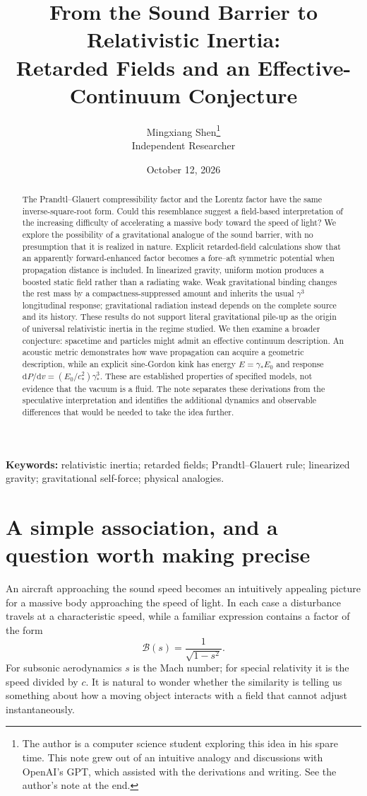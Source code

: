 \documentclass[11pt,a4paper]{article}
\title{From the Sound Barrier to Relativistic Inertia:\\
\large Retarded Fields and an Effective-Continuum Conjecture}
\author{Mingxiang Shen\thanks{The author is a computer science student exploring this idea in his spare time. This note grew out of an intuitive analogy and discussions with OpenAI's GPT, which assisted with the derivations and writing. See the author's note at the end.}\\[3pt]
\normalsize Independent Researcher}
\date{October 12, 2026}
\numberwithin{equation}{section}
\newcommand{\dd}{\mathrm{d}}
\begin{document}
\maketitle

\begin{abstract}
The Prandtl--Glauert compressibility factor and the Lorentz factor have the same inverse-square-root form. Could this resemblance suggest a field-based interpretation of the increasing difficulty of accelerating a massive body toward the speed of light? We explore the possibility of a gravitational analogue of the sound barrier, with no presumption that it is realized in nature. Explicit retarded-field calculations show that an apparently forward-enhanced factor becomes a fore--aft symmetric potential when propagation distance is included. In linearized gravity, uniform motion produces a boosted static field rather than a radiating wake. Weak gravitational binding changes the rest mass by a compactness-suppressed amount and inherits the usual $\gamma^3$ longitudinal response; gravitational radiation instead depends on the complete source and its history. These results do not support literal gravitational pile-up as the origin of universal relativistic inertia in the regime studied. We then examine a broader conjecture: spacetime and particles might admit an effective continuum description. An acoustic metric demonstrates how wave propagation can acquire a geometric description, while an explicit sine-Gordon kink has energy $E=\gamma_*E_0$ and response $\dd P/\dd v=(E_0/c_*^2)\gamma_*^3$. These are established properties of specified models, not evidence that the vacuum is a fluid. The note separates these derivations from the speculative interpretation and identifies the additional dynamics and observable differences that would be needed to take the idea further.
\end{abstract}

\noindent\textbf{Keywords:} relativistic inertia; retarded fields; Prandtl--Glauert rule; linearized gravity; gravitational self-force; physical analogies.

\section{A simple association, and a question worth making precise}

An aircraft approaching the sound speed becomes an intuitively appealing picture for a massive body approaching the speed of light. In each case a disturbance travels at a characteristic speed, while a familiar expression contains a factor of the form
\begin{equation}
 \mathcal{B}(s)=\frac{1}{\sqrt{1-s^2}}.
 \label{eq:common-factor}
\end{equation}
For subsonic aerodynamics $s$ is the Mach number; for special relativity it is the speed divided by $c$. It is natural to wonder whether the similarity is telling us something about how a moving object interacts with a field that cannot adjust instantaneously.
\end{document}
